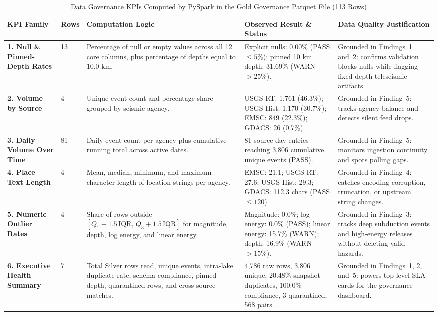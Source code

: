 \begin{table}[!t]
\centering
\caption{Data Governance KPIs Computed by PySpark in the Gold Governance Parquet File (113 Rows)}
\label{tab:governance_kpis}
\footnotesize
\renewcommand{\arraystretch}{1.15}
\begin{tabularx}{\textwidth}{p{2.6cm} p{0.7cm} p{4.2cm} p{3.1cm} X}
\toprule
\textbf{KPI Family} & \textbf{Rows} & \textbf{Computation Logic} & \textbf{Observed Result \& Status} & \textbf{Data Quality Justification} \\
\midrule
\textbf{1. Null \& Pinned-Depth Rates} & 13 & Percentage of null or empty values across all 12 core columns, plus percentage of depths equal to $10.0\text{ km}$. & Explicit nulls: 0.00\% (PASS $\le 5\%$); pinned 10 km depth: 31.69\% (WARN $> 25\%$). & Grounded in Findings~1 and~2: confirms validation blocks nulls while flagging fixed-depth teleseismic artifacts. \\
\textbf{2. Volume by Source} & 4 & Unique event count and percentage share grouped by seismic agency. & USGS RT: 1,761 (46.3\%); USGS Hist: 1,170 (30.7\%); EMSC: 849 (22.3\%); GDACS: 26 (0.7\%). & Grounded in Finding~5: tracks agency balance and detects silent feed drops. \\
\textbf{3. Daily Volume Over Time} & 81 & Daily event count per agency plus cumulative running total across active dates. & 81 source-day entries reaching 3,806 cumulative unique events (PASS). & Grounded in Finding~5: monitors ingestion continuity and spots polling gaps. \\
\textbf{4. Place Text Length} & 4 & Mean, median, minimum, and maximum character length of location strings per agency. & EMSC: 21.1; USGS RT: 27.6; USGS Hist: 29.3; GDACS: 112.3 chars (PASS $\le 120$). & Grounded in Finding~4: catches encoding corruption, truncation, or upstream string changes. \\
\textbf{5. Numeric Outlier Rates} & 4 & Share of rows outside $[Q_1 - 1.5\,\text{IQR},\, Q_3 + 1.5\,\text{IQR}]$ for magnitude, depth, log energy, and linear energy. & Magnitude: 0.0\%; log energy: 0.0\% (PASS); linear energy: 15.7\% (WARN); depth: 16.9\% (WARN $> 15\%$). & Grounded in Finding~3: tracks deep subduction events and high-energy releases without deleting valid hazards. \\
\textbf{6. Executive Health Summary} & 7 & Total Silver rows read, unique events, intra-lake duplicate rate, schema compliance, pinned depth, quarantined rows, and cross-source matches. & 4,786 raw rows, 3,806 unique, 20.48\% snapshot duplicates, 100.0\% compliance, 3 quarantined, 568 pairs. & Grounded in Findings~1, 2, and~5: powers top-level SLA cards for the governance dashboard. \\
\bottomrule
\end{tabularx}
\end{table}

